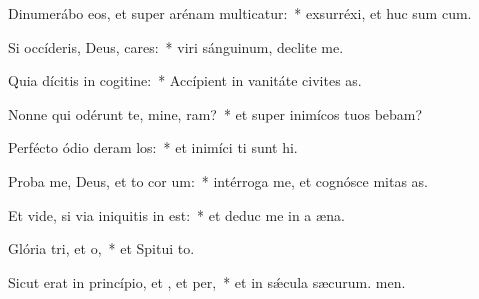 \item Dinumerábo eos, et super arénam multicatur:~* exsurréxi, et huc sum cum.
\item Si occíderis, Deus, cares:~* viri sánguinum, declite  me.
\item Quia dícitis in cogitine:~* Accípient in vanitáte civites as.
\item Nonne qui odérunt te, mine, ram?~* et super inimícos tuos bebam?
\item Perfécto ódio deram los:~* et inimíci ti sunt hi.
\item Proba me, Deus, et to cor um:~* intérroga me, et cognósce mitas as.
\item Et vide, si via iniquitis in  est:~* et deduc me in a æna.
\item Glória tri, et o,~* et Spitui to.
\item Sicut erat in princípio, et , et per,~* et in sǽcula sæcurum. men.
